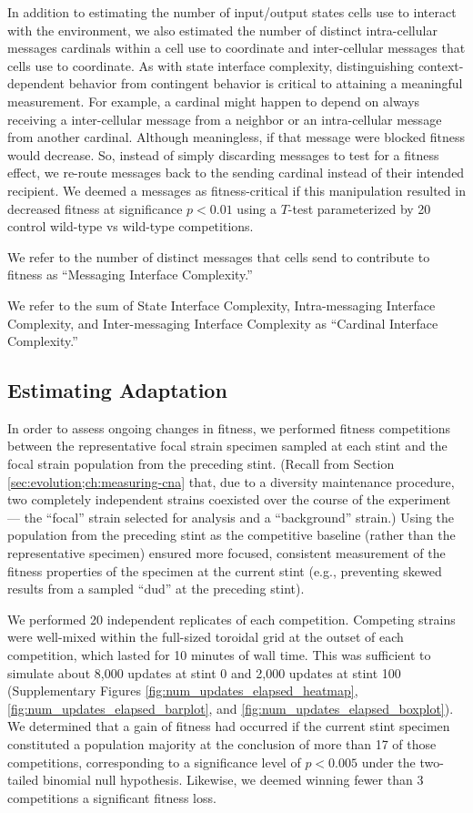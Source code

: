 In addition to estimating the number of input/output states cells use to interact with the environment, we also estimated the number of distinct intra-cellular messages cardinals within a cell use to coordinate and inter-cellular messages that cells use to coordinate.
As with state interface complexity, distinguishing context-dependent behavior from contingent behavior is critical to attaining a meaningful measurement.
For example, a cardinal might happen to depend on always receiving a inter-cellular message from a neighbor or an intra-cellular message from another cardinal.
Although meaningless, if that message were blocked fitness would decrease.
So, instead of simply discarding messages to test for a fitness effect, we re-route messages back to the sending cardinal instead of their intended recipient.
We deemed a messages as fitness-critical if this manipulation resulted in decreased fitness at significance $p < 0.01$ using a $T$-test parameterized by 20 control wild-type vs wild-type competitions.

We refer to the number of distinct messages that cells send to contribute to fitness as ``Messaging Interface Complexity.''

We refer to the sum of State Interface Complexity, Intra-messaging Interface Complexity, and Inter-messaging Interface Complexity as ``Cardinal Interface Complexity.''

\subsection{Estimating Adaptation}
\label{sec:measuring-adaptation;ch:measuring-cna}

In order to assess ongoing changes in fitness, we performed fitness competitions between the representative focal strain specimen sampled at each stint and the focal strain population from the preceding stint.
(Recall from Section \ref{sec:evolution;ch:measuring-cna} that, due to a diversity maintenance procedure, two completely independent strains coexisted over the course of the experiment --- the ``focal'' strain selected for analysis and a ``background'' strain.)
Using the population from the preceding stint as the competitive baseline (rather than the representative specimen) ensured more focused, consistent measurement of the fitness properties of the specimen at the current stint (e.g., preventing skewed results from a sampled ``dud'' at the preceding stint).

We performed 20 independent replicates of each competition.
Competing strains were well-mixed within the full-sized toroidal grid at the outset of each competition, which lasted for 10 minutes of wall time.
This was sufficient to simulate about 8,000 updates at stint 0 and 2,000 updates at stint 100 (Supplementary Figures \ref{fig:num_updates_elapsed_heatmap}, \ref{fig:num_updates_elapsed_barplot}, and \ref{fig:num_updates_elapsed_boxplot}).
We determined that a gain of fitness had occurred if the current stint specimen constituted a population majority at the conclusion of more than 17 of those competitions, corresponding to a significance level of $p < 0.005$ under the two-tailed binomial null hypothesis.
Likewise, we deemed winning fewer than 3 competitions a significant fitness loss.


